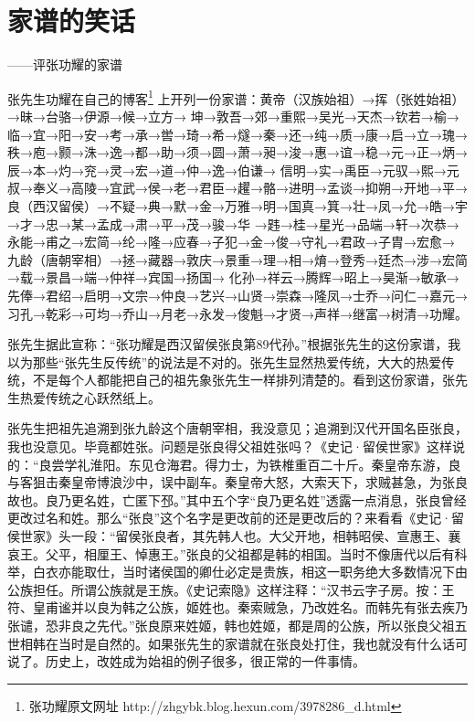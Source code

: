 \section{家谱的笑话}
\centerline{
	\yuesong ——评张功耀的家谱
}

\mbox{}

张先生功耀在自己的博客\footnote{张功耀原文网址 http://zhgybk.blog.hexun.com/3978286\_d.html}
上开列一份家谱：黄帝（汉族始祖）→挥（张姓始祖）→昧→台骆→伊源→候→立方→
坤→敦吾→郊→重熙→吴光→天杰→钦若→榆→临→宜→阳→安→考→承→喾→琦→希→燧→秦→还→纯→质→康→启→立→瑰→
秩→庖→颢→洙→逸→都→助→须→圆→萧→昶→浚→惠→谊→稳→元→正→炳→辰→本→灼→兖→灵→宏→道→仲→逸→伯谦→
信明→实→禹臣→元驭→熙→元叔→奉义→高陵→宜武→侯→老→君臣→趯→骼→进明→孟谈→抑朔→开地→平→
良（西汉留侯）→不疑→典→默→金→万雅→明→国真→箕→壮→凤→允→皓→宇→才→忠→某→孟成→肃→平→茂→骏→华
→韪→桂→星光→品端→轩→次恭→永能→甫之→宏简→纶→隆→应春→子犯→金→俊→守礼→君政→子胄→宏愈→
九龄（唐朝宰相）→拯→藏器→敦庆→景重→理→相→焴→登秀→廷杰→涉→宏简→载→景昌→端→仲祥→宾国→扬国→
化孙→祥云→腾辉→昭上→昊渐→敏承→先俸→君绍→启明→文宗→仲良→艺兴→山贤→崇森→隆凤→士乔→问仁→嘉元→
习孔→乾彩→可均→乔山→月老→永发→俊魁→才贤→声祥→继富→树清→功耀。

张先生据此宣称：“张功耀是西汉留侯张良第89代孙。”根据张先生的这份家谱，我以为那些“张先生反传统”的说法是不对的。张先生显然热爱传统，大大的热爱传统，不是每个人都能把自己的祖先象张先生一样排列清楚的。看到这份家谱，张先生热爱传统之心跃然纸上。

张先生把祖先追溯到张九龄这个唐朝宰相，我没意见；追溯到汉代开国名臣张良，我也没意见。毕竟都姓张。问题是张良得父祖姓张吗？《史记·留侯世家》这样说的：“良尝学礼淮阳。东见仓海君。得力士，为铁椎重百二十斤。秦皇帝东游，良与客狙击秦皇帝博浪沙中，误中副车。秦皇帝大怒，大索天下，求贼甚急，为张良故也。良乃更名姓，亡匿下邳。”其中五个字“良乃更名姓”透露一点消息，张良曾经更改过名和姓。那么“张良”这个名字是更改前的还是更改后的？来看看《史记·留侯世家》头一段：“留侯张良者，其先韩人也。大父开地，相韩昭侯、宣惠王、襄哀王。父平，相厘王、悼惠王。”张良的父祖都是韩的相国。当时不像唐代以后有科举，白衣亦能取仕，当时诸侯国的卿仕必定是贵族，相这一职务绝大多数情况下由公族担任。所谓公族就是王族。《史记索隐》这样注释：“汉书云字子房。按：王符、皇甫谧并以良为韩之公族，姬姓也。秦索贼急，乃改姓名。而韩先有张去疾乃张谴，恐非良之先代。”张良原来姓姬，韩也姓姬，都是周的公族，所以张良父祖五世相韩在当时是自然的。如果张先生的家谱就在张良处打住，我也就没有什么话可说了。历史上，改姓成为始祖的例子很多，很正常的一件事情。

